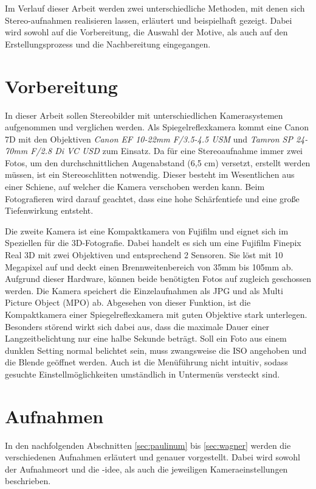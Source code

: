 \documentclass[liststotoc,bibtotoc,fontsize=14pt,]{scrreprt}
\begin{document}
	Im Verlauf dieser Arbeit werden zwei unterschiedliche Methoden, mit denen sich Stereo-aufnahmen realisieren lassen, erläutert und beispielhaft gezeigt. Dabei wird sowohl auf die Vorbereitung, die Auswahl der Motive, als auch auf den Erstellungsprozess und die Nachbereitung eingegangen.
	
	\chapter{Vorbereitung}
	In dieser Arbeit sollen Stereobilder mit unterschiedlichen Kamerasystemen aufgenommen und verglichen werden. Als Spiegelreflexkamera kommt eine Canon 7D mit den Objektiven \textit{Canon EF 10-22mm F/3.5-4.5 USM} und	\textit{Tamron SP 24-70mm F/2.8 Di VC USD} zum Einsatz. Da für eine Stereoaufnahme immer zwei Fotos, um den durchschnittlichen Augenabstand (6,5 cm) versetzt, erstellt werden müssen, ist ein Stereoschlitten notwendig. Dieser besteht im Wesentlichen aus einer Schiene, auf welcher die Kamera verschoben werden kann. Beim Fotografieren wird darauf geachtet, dass eine hohe Schärfentiefe und eine große Tiefenwirkung entsteht.
	
	Die zweite Kamera ist eine Kompaktkamera von Fujifilm und eignet sich im Speziellen für die 3D-Fotografie. Dabei handelt es sich um eine Fujifilm Finepix Real 3D mit zwei Objektiven und entsprechend 2 Sensoren. Sie löst mit 10 Megapixel auf und deckt einen Brennweitenbereich von 35mm bis 105mm ab. Aufgrund dieser Hardware, können beide benötigten Fotos auf zugleich geschossen werden. Die Kamera speichert die Einzelaufnahmen als JPG und als Multi Picture Object (MPO) ab. Abgesehen von dieser Funktion, ist die Kompaktkamera einer Spiegelreflexkamera mit guten Objektive stark unterlegen. Besonders störend wirkt sich dabei aus, dass die maximale Dauer einer Langzeitbelichtung nur eine halbe Sekunde beträgt. Soll ein Foto aus einem dunklen Setting normal belichtet sein, muss zwangsweise die ISO angehoben und die Blende geöffnet werden. Auch ist die Menüführung nicht intuitiv, sodass gesuchte Einstellmöglichkeiten umständlich in Untermenüs versteckt sind.
	
			
	\chapter{Aufnahmen}
	\label{ch:aufnahmen}
	In den nachfolgenden Abschnitten \ref{sec:paulinum} bis \ref{sec:wagner} werden die verschiedenen Aufnahmen erläutert und genauer vorgestellt. Dabei wird sowohl der Aufnahmeort und die -idee, als auch die jeweiligen Kameraeinstellungen beschrieben. 
	
\end{document}
